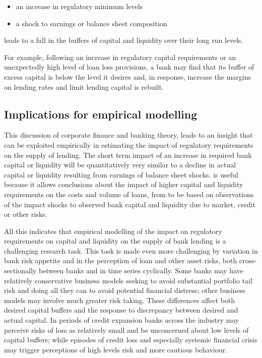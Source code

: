\documentclass[
  12,
]{article}
\begin{document}
\begin{itemize}
    \item an increase in regulatory minimum levels
    \item a shock to earnings or balance sheet composition
\end{itemize}

leads to a fall in the buffers of capital and liquidity over their long run levels.

For example, following an increase in regulatory capital requirements or an unexpectedly high level of loan loss provisions, a bank may find that its buffer of excess capital is below the level it desires and, in response, increase the margins on lending rates and limit lending capital is rebuilt.

\hypertarget{implications-for-empirical-modelling-1}{%
\subsection{Implications for empirical modelling}\label{implications-for-empirical-modelling-1}}

This discussion of corporate finance and banking theory, leads to an insight that can be exploited empirically in estimating the impact of regulatory requirements on the supply of lending. The short term impact of an increase in required bank capital or liquidity will be quantitatively very similar to a decline in actual capital or liquidity resulting from earnings of balance sheet shocks. is useful because it allows conclusions about the impact of higher capital and liquidity requirements on the costs and volume of loans, from to be based on observations of the impact shocks to observed bank capital and liquidity due to market, credit or other risks.

All this indicates that empirical modelling of the impact on regulatory requirements on capital and liquidity on the supply of bank lending is a challenging research task. This task is made even more challenging by variation in bank risk appetite and in the perception of loan and other asset risks, both cross-sectionally between banks and in time series cyclically. Some banks may have relatively conservative business models seeking to avoid substantial portfolio tail risk and doing all they can to avoid potential financial distress; other business models may involve much greater risk taking. These differences affect both desired capital buffers and the response to discrepancy between desired and actual capital. In periods of credit expansion banks across the industry may perceive risks of loss as relatively small and be unconcerned about low levels of capital buffers; while episodes of credit loss and especially systemic financial crisis may trigger perceptions of high levels risk and more cautious behaviour.
\end{document}
